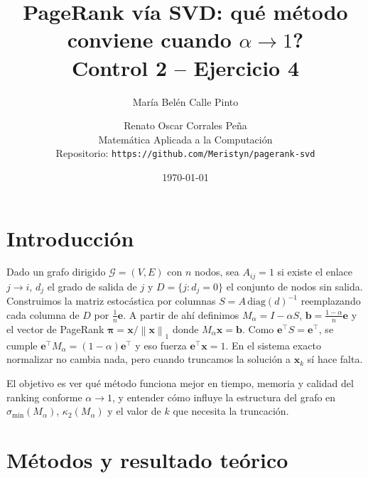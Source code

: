 \documentclass[11pt,a4paper]{article}
\title{PageRank v\'ia SVD: \textquestiondown qu\'e m\'etodo conviene cuando $\alpha\to 1$?\\[2pt]
\large Control 2 -- Ejercicio 4}
\author{Mar\'ia Bel\'en Calle Pinto \and Renato Oscar Corrales Pe\~na\\[2pt]
  Matem\'atica Aplicada a la Computaci\'on \\
  Repositorio: \texttt{https://github.com/Meristyn/pagerank-svd}}
\date{\today}
\newcommand{\norm}[1]{\left\lVert #1\right\rVert}
\newcommand{\e}{\mathbf{e}}
\newcommand{\bb}{\mathbf{b}}
\newcommand{\bx}{\mathbf{x}}
\newcommand{\pib}{\boldsymbol{\pi}}
\begin{document}
\maketitle

\section{Introducci\'on}
Dado un grafo dirigido $\mathcal G=(V,E)$ con $n$ nodos, sea $A_{ij}=1$ si existe el enlace $j\to i$, $d_j$ el grado de salida de $j$ y $D=\{j:d_j=0\}$ el conjunto de nodos sin salida. Construimos la matriz estoc\'astica por columnas $S=A\,\mathrm{diag}(d)^{-1}$ reemplazando cada columna de $D$ por $\frac1n\e$. A partir de ah\'i definimos $M_\alpha=I-\alpha S$, $\bb=\frac{1-\alpha}{n}\e$ y el vector de PageRank $\pib=\bx/\norm{\bx}_1$ donde $M_\alpha\bx=\bb$. Como $\e^\top S=\e^\top$, se cumple $\e^\top M_\alpha=(1-\alpha)\e^\top$ y eso fuerza $\e^\top\bx=1$. En el sistema exacto normalizar no cambia nada, pero cuando truncamos la soluci\'on a $\bx_k$ s\'i hace falta.

El objetivo es ver qu\'e m\'etodo funciona mejor en tiempo, memoria y calidad del ranking conforme $\alpha\to 1$, y entender c\'omo influye la estructura del grafo en $\sigma_{\min}(M_\alpha)$, $\kappa_2(M_\alpha)$ y el valor de $k$ que necesita la truncaci\'on.

\section{M\'etodos y resultado te\'orico}
\end{document}
